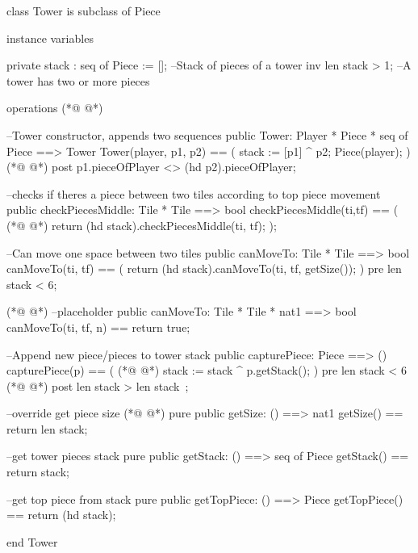\begin{vdmpp}[breaklines=true]
class Tower is subclass of Piece

instance variables

 private stack : seq of Piece := []; --Stack of pieces of a tower
 inv len stack > 1; --A tower has two or more pieces
 
operations
(*@
\label{Tower:9}
@*)

  --Tower constructor, appends two sequences
  public Tower: Player * Piece * seq of Piece ==> Tower
  Tower(player, p1, p2) == ( 
    stack := [p1] ^ p2;
    Piece(player);
  )
(*@
\label{checkPiecesMiddle:16}
@*)
  post p1.pieceOfPlayer <> (hd p2).pieceOfPlayer;
  
  --checks if theres a piece between two tiles according to top piece movement
  public checkPiecesMiddle: Tile * Tile ==> bool
  checkPiecesMiddle(ti,tf) == (
(*@
\label{canMoveTo:21}
@*)
    return (hd stack).checkPiecesMiddle(ti, tf);
  );
  
  --Can move one space between two tiles
  public canMoveTo: Tile * Tile ==> bool
  canMoveTo(ti, tf) == (
    return (hd stack).canMoveTo(ti, tf, getSize());
  )
  pre len stack < 6;
  
(*@
\label{capturePiece:31}
@*)
  --placeholder
  public canMoveTo: Tile * Tile * nat1 ==> bool
  canMoveTo(ti, tf, n) == return true;
  
  --Append new piece/pieces to tower stack
  public capturePiece: Piece ==> ()
  capturePiece(p) == (
(*@
\label{getSize:38}
@*)
   stack := stack ^ p.getStack();
  )
  pre len stack < 6
(*@
\label{getStack:41}
@*)
  post len stack > len stack~;
  
  --override get piece size
(*@
\label{getTopPiece:44}
@*)
  pure public getSize: () ==> nat1
  getSize() == return len stack;
  
  --get tower pieces stack
  pure public getStack: () ==> seq of Piece
  getStack() == return stack;
  
  --get top piece from stack
  pure public getTopPiece: () ==> Piece
  getTopPiece() == return (hd stack);
  
end Tower
\end{vdmpp}
